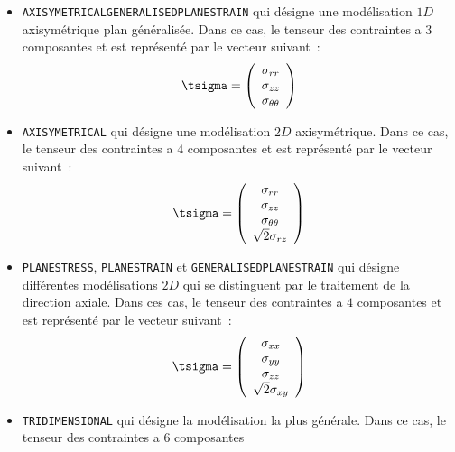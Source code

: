 \documentclass[rectoverso,pleiades,pstricks,leqno,anti]{texmf/note_technique_2010}
\begin{document}
\begin{itemize}
  \item \texttt{AXISYMETRICAL\-GENERALISED\-PLANE\-STRAIN} qui désigne
  une modélisation \(1D\) axisymétrique plan généralisée. Dans ce cas,
  le tenseur des contraintes a \(3\) composantes et est représenté par
  le vecteur suivant~:
  \begin{equation}
    \label{eq:tsigma} \tsigma = \left(
    \begin{array}{c}
      \sigma_{rr} \\
      \sigma_{zz} \\
      \sigma_{\theta\theta} \\
    \end{array}
    \right)
  \end{equation}
  \item \texttt{AXI\-SYMETRICAL} qui désigne une modélisation \(2D\)
  axisymétrique. Dans ce cas, le tenseur des contraintes a \(4\)
  composantes et est représenté par le vecteur suivant~:
  \begin{equation}
    \label{eq:tsigma} \tsigma = \left(
    \begin{array}{c}
      \sigma_{rr} \\
      \sigma_{zz} \\
      \sigma_{\theta\theta} \\
      \sqrt{2}\sigma_{rz} \\
    \end{array}
    \right)
  \end{equation}
  \item \texttt{PLANE\-STRESS}, \texttt{PLANE\-STRAIN} et
  \texttt{GENERALISED\-PLANE\-STRAIN} qui désigne différentes
  modélisations \(2D\) qui se distinguent par le traitement de la
  direction axiale. Dans ces cas, le tenseur des contraintes a \(4\)
  composantes et est représenté par le vecteur suivant~:
  \begin{equation}
    \label{eq:tsigma} \tsigma = \left(
    \begin{array}{c}
      \sigma_{xx} \\
      \sigma_{yy} \\
      \sigma_{zz} \\
      \sqrt{2}\sigma_{xy} \\
    \end{array}
    \right)
  \end{equation}
  \item \texttt{TRIDIMENSIONAL} qui désigne la modélisation la plus
  générale. Dans ce cas, le tenseur des contraintes a \(6\) composantes

\end{itemize}
\end{document}

